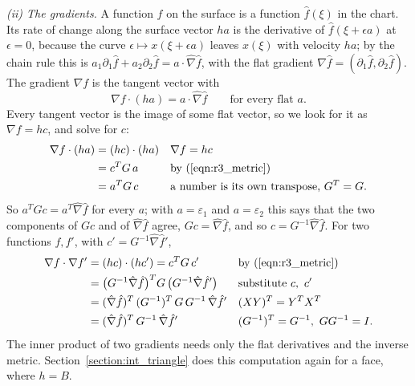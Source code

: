 \emph{(ii) The gradients.} A function $f$ on the surface is a function $\hat f(\xi)$ in the chart. Its rate of change along the surface vector $ha$ is the derivative of $\hat f(\xi + \epsilon a)$ at $\epsilon = 0$, because the curve $\epsilon \mapsto x(\xi + \epsilon a)$ leaves $x(\xi)$ with velocity $ha$; by the chain rule this is $a_1\partial_1\hat f + a_2\partial_2\hat f = a\cdot\hat\nabla\hat f$, with the flat gradient $\hat\nabla\hat f = (\partial_1\hat f, \partial_2\hat f)$. The gradient $\nabla f$ is the tangent vector with
\begin{equation*}
\nabla f\cdot (ha) = a\cdot\hat\nabla\hat f \qquad\text{for every flat } a .
\end{equation*}
Every tangent vector is the image of some flat vector, so we look for it as $\nabla f = hc$, and solve for $c$:
\begin{align*}
\nabla f\cdot (ha) &= (hc)\cdot (ha) && \nabla f = hc \\
&= c^T G\, a && \text{by (\ref{eqn:r3_metric})} \\
&= a^T G\, c && \text{a number is its own transpose, } G^T = G .
\end{align*}
So $a^T G c = a^T\hat\nabla\hat f$ for every $a$; with $a = \varepsilon_1$ and $a = \varepsilon_2$ this says that the two components of $Gc$ and of $\hat\nabla\hat f$ agree, $Gc = \hat\nabla\hat f$, and so $c = G^{-1}\hat\nabla\hat f$. For two functions $f, f'$, with $c' = G^{-1}\hat\nabla\hat f'$,
\begin{align}
\nabla f\cdot\nabla f' &= (hc)\cdot(hc') = c^T G\, c' && \text{by (\ref{eqn:r3_metric})} \notag \\
&= \big(G^{-1}\hat\nabla\hat f\big)^T G\, \big(G^{-1}\hat\nabla\hat f'\big) && \text{substitute } c,\ c' \notag \\
&= (\hat\nabla\hat f)^T\, (G^{-1})^T\, G\, G^{-1}\, \hat\nabla\hat f' && (XY)^T = Y^TX^T \notag \\
&= (\hat\nabla\hat f)^T\, G^{-1}\, \hat\nabla\hat f' && (G^{-1})^T = G^{-1},\ G G^{-1} = I . \label{eqn:r3_grad}
\end{align}
The inner product of two gradients needs only the flat derivatives and the inverse metric. Section~\ref{section:int_triangle} does this computation again for a face, where $h = B$.

